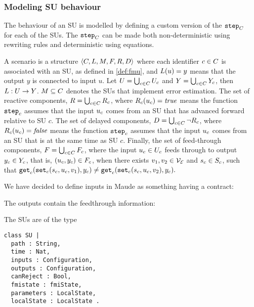 \subsubsection{Modeling SU behaviour}
The behaviour of an SU is modelled by defining a custom version of the $\mathtt{step}_{C}$ for each of the SUs. 
The $\mathtt{step}_{C}$ can be made both non-deterministic using rewriting rules and deterministic using equations.



\begin{definition}[Scenario]\label{def:cosim_scenario}
  A scenario is a structure $ \left\langle C, L, M, F, R, D \right\rangle $ where each identifier $c \in C$ is associated with an SU, as defined in \cref{def:fmu}, and $L(u)=y$ means that the output $y$ is connected to input $u$.
  Let $U = \bigcup_{c \in C} U_{c}$ and $Y = \bigcup_{c \in C} Y_{c}$, then $L : U \to Y$. 
  $M \subseteq C$ denotes the SUs that implement error estimation. 
  The set of reactive components,
  $R = \bigcup_{c \in C} R_{c}$, where $R_{c}(u_{c}) = \mathit{true}$ means the function $\mathtt{step}_{c}$ assumes that the input $u_{c}$ comes from an SU that has advanced forward relative to SU $c$.  
The set of delayed components,
  $D = \bigcup_{c \in C} \neg R_{c}$, where $R_{c}(u_{c}) = \mathit{false}$ means the function $\mathtt{step}_{c}$ assumes that the input $u_{c}$ comes from an SU that is at the same time as SU $c$. 
 Finally, the set of feed-through components, $F = \bigcup_{c \in C} F_{c}$, where the input $u_{c} \in U_{c}$ feeds through to output $y_{c} \in Y_{c}$, that is, $(u_{c},y_{c}) \in F_{c}$, when there exists $v_1, v_2 \in \mathcal{V_{E}}$ and $s_{c} \in S_{c}$, such that
  $\mathtt{get}_{c} (\mathtt{set}_{c}(s_{c}, u_{c}, v_1), y_{c}) \neq \mathtt{get}_{c} (\mathtt{set}_{c}(s_{c}, u_{c}, v_2), y_{c}).$
\end{definition}  

We have decided to define inputs in Maude as something having a contract:

The outputs contain the feedthrough information:

The SUs are of the type 
\begin{lstlisting}
class SU |
  path : String, 
  time : Nat, 
  inputs : Configuration, 
  outputs : Configuration,
  canReject : Bool, 
  fmistate : fmiState,
  parameters : LocalState,
  localState : LocalState .
\end{lstlisting}



